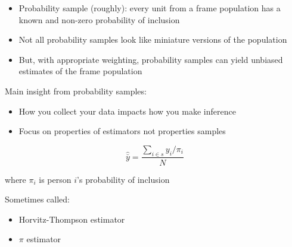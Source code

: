 \documentclass[aspectratio=169]{beamer}
\begin{document}
\begin{frame}

\begin{itemize}
\item Probability sample (roughly): every unit from a frame population has a known and non-zero probability of inclusion
\pause
\item Not all probability samples look like miniature versions of the population
\pause
\item But, with appropriate weighting, probability samples can yield unbiased estimates of the frame population
\end{itemize}

\end{frame}
\begin{frame}

Main insight from probability samples:\\
\begin{itemize}
\item How you collect your data impacts how you make inference
\item Focus on properties of estimators not properties samples
\end{itemize}

\end{frame}
\begin{frame}

\begin{equation*}
\hat{\bar{y}} = \frac{\sum_{i \in s} y_i / \pi_i }{N}
\end{equation*}

where $\pi_i$ is person $i$'s probability of inclusion

\vfill

Sometimes called:
\begin{itemize}
\item Horvitz-Thompson estimator
\item $\pi$ estimator
\end{itemize}

\end{frame}
\end{document}
